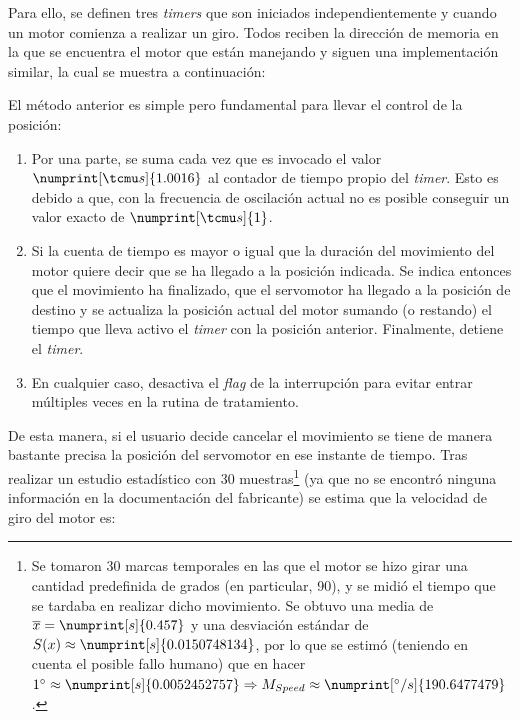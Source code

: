 Para ello, se definen tres \textit{timers} que son iniciados independientemente y
cuando un motor comienza a realizar un giro. Todos reciben la dirección de memoria
en la que se encuentra el motor que están manejando y siguen una implementación
similar, la cual se muestra a continuación:



El método anterior es simple pero fundamental para llevar el control de la posición:

\begin{enumerate}
    \item Por una parte, se suma cada vez que es invocado el valor $\numprint[\tcmu s]{1.0016}$
    al contador de tiempo propio del \textit{timer}. Esto es debido a que, con la frecuencia
    de oscilación actual no es posible conseguir un valor exacto de $\numprint[\tcmu s]{1}$.
    \item Si la cuenta de tiempo es mayor o igual que la duración del movimiento del
    motor quiere decir que se ha llegado a la posición indicada. Se indica entonces que
    el movimiento ha finalizado, que el servomotor ha llegado a la posición de destino
    y se actualiza la posición actual del motor sumando (o restando) el tiempo que lleva
    activo el \textit{timer} con la posición anterior. Finalmente, detiene el \textit{timer}.
    \item En cualquier caso, desactiva el \textit{flag} de la interrupción para evitar
    entrar múltiples veces en la rutina de tratamiento.
\end{enumerate}

De esta manera, si el usuario decide cancelar el movimiento se tiene de manera
bastante precisa la posición del servomotor en ese instante de tiempo. Tras realizar
un estudio estadístico con 30 muestras\footnote{Se tomaron 30 marcas temporales en las
que el motor se hizo girar una cantidad predefinida de grados (en particular, 90\textdegree),
y se midió el tiempo que se tardaba en realizar dicho movimiento. Se obtuvo una media de
$\overline{x} = \numprint[s]{0.457}$ y una desviación estándar de 
$S(x) \approx \numprint[s]{0.0150748134}$, por lo que se estimó (teniendo en cuenta
el posible fallo humano) que en hacer 
$1\degree \approx \numprint[s]{0.0052452757} \Rightarrow M_{Speed} \approx \numprint[\degree / s]{190.6477479}$.}
(ya que no se encontró ninguna información en la documentación del fabricante)
se estima que la velocidad de giro del motor es:

